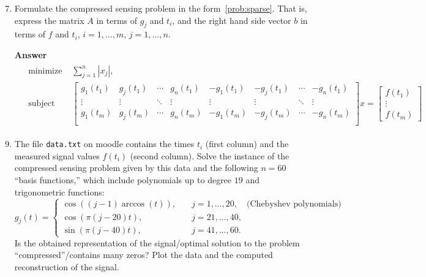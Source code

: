 \documentclass[10pt,a4paper]{article}
\theoremstyle{plain}
\theoremstyle{definition}
\begin{document}
\begin{enumerate}
  \setcounter{enumi}{6}
  \item Formulate the compressed sensing problem in the form~\eqref{prob:sparse}.
  That is, express the matrix \(A\) in terms of \(g_j\) and \(t_i\), and the right hand side vector \(b\) in terms of \(f\) and \(t_i\),
  \(i=1,\dots,m\), \(j=1,\dots,n\).
  \item[\textbf{Answer}]
  \begin{align*}
    \begin{aligned}
      &\text{minimize\ }& \sum_{j=1}^n |x_j|,\\
      &\text{subject to\ }& \begin{bmatrix}
        g_1(t_1) & g_j(t_1) & \cdots & g_n(t_1) & -g_1(t_1) & -g_j(t_1) & \cdots & -g_n(t_1) \\
        \vdots & \vdots & \ddots & \vdots & \vdots & \vdots & \ddots & \vdots \\
        g_1(t_m) & g_j(t_m) & \cdots & g_n(t_m) & -g_1(t_m) & -g_j(t_m) & \cdots & -g_n(t_m) \\
      \end{bmatrix}x=\begin{bmatrix}
        f(t_1) \\
        \vdots \\
        f(t_m)
      \end{bmatrix}
    \end{aligned}
  \end{align*}
  \item
  The file \verb|data.txt| on moodle contains the times \(t_i\) (first column) and the measured signal values \(f(t_i)\) (second column).
  Solve the instance of the compressed sensing problem given by this data and the following \(n=60\) ``basis functions,'' which include polynomials up to degree \(19\) and trigonometric functions:
  \[
    g_j(t) = \begin{cases}
    \cos((j-1)\arccos(t)), &\quad j=1,\dots,20, \quad\text{(Chebyshev polynomials)}\\
    \cos(\pi (j-20) t), &\quad j=21,\dots,40,\\
    \sin(\pi (j-40) t), &\quad j=41,\dots,60.
  \end{cases}
  \]
  Is the obtained representation of the signal/optimal solution to the problem ``compressed''/contains many zeros?
  Plot the data and the computed reconstruction of the signal.


\end{enumerate}
\end{document}
